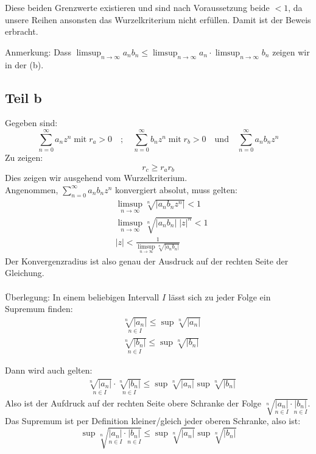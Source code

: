 \documentclass[a4paper,german,12pt,smallheadings]{scrartcl}
\begin{document}
Diese beiden Grenzwerte existieren und sind nach Voraussetzung beide $<1$, da unsere Reihen ansonsten das Wurzelkriterium nicht erfüllen. Damit ist der Beweis erbracht.

Anmerkung: Dass $\limsup_{n \to \infty} a_nb_n \leq \limsup_{n \to \infty} a_n \cdot \limsup_{n \to \infty} b_n$ zeigen wir in der (b).

\subsection*{Teil b}

Gegeben sind:
\begin{equation*}
\sum\limits_{n=0}^{\infty} a_n z^n \; \text{mit} \; r_a>0\quad ; \quad \sum\limits_{n=0}^{\infty} b_n z^n \; \text{mit} \; r_b>0 \quad \text{und} \quad  \sum\limits_{n=0}^{\infty} a_n b_n z^n
\end{equation*}
Zu zeigen:
\begin{equation*}
r_c \geq r_a r_b
\end{equation*}
Dies zeigen wir ausgehend vom Wurzelkriterium.\\
Angenommen, $\sum\limits_{n=0}^{\infty} a_n b_n z^n$ konvergiert absolut, muss gelten:
\begin{align*}
  & \limsup\limits_{n \to \infty} \sqrt[n]{|a_n b_n z^n|} < 1 \\
  & \limsup\limits_{n \to \infty} \sqrt[n]{|a_n b_n| \; |z|^n} < 1\\
  & |z| < \frac{1}{\limsup\limits_{n \to \infty} \sqrt[n]{|a_n b_n|}}
\end{align*}
Der Konvergenzradius ist also genau der Ausdruck auf der rechten Seite der Gleichung.\\
\\
Überlegung: In einem beliebigen Intervall $I$ lässt sich zu jeder Folge ein Supremum finden:
\begin{align*}
  & \underset{n \in I}{\sqrt[n]{|a_n|}} \leq \sup \sqrt[n]{|a_n|}\\
  & \underset{n \in I}{\sqrt[n]{|b_n|}} \leq \sup \sqrt[n]{|b_n|}
\end{align*}

Dann wird auch gelten:
\begin{align*} 
  & \underset{n \in I}{\sqrt[n]{|a_n|}} \cdot \underset{n \in I}{\sqrt[n]{|b_n|}} \leq \sup \sqrt[n]{|a_n|} \sup \sqrt[n]{|b_n|}
\end{align*}
Also ist der Aufdruck auf der rechten Seite obere Schranke der Folge $\sqrt[n]{\underset{n \in I}{|a_n|} \cdot \underset{n \in I}{|b_n|}}$. Das Supremum ist per Definition kleiner/gleich jeder oberen Schranke, also ist:
\begin{equation*}
\sup \sqrt[n]{\underset{n \in I}{|a_n|} \cdot \underset{n \in I}{|b_n|}} \leq \sup \sqrt[n]{|a_n|} \sup \sqrt[n]{|b_n|}
\end{equation*}
\end{document}
